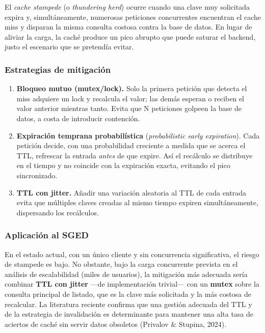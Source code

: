 \documentclass[12pt]{article}
\begin{document}
	El \textit{cache stampede} (o \textit{thundering herd}) ocurre cuando una clave muy solicitada expira y, simultáneamente, numerosas peticiones concurrentes encuentran el cache miss y disparan la misma consulta costosa contra la base de datos. En lugar de aliviar la carga, la caché produce un pico abrupto que puede saturar el backend, justo el escenario que se pretendía evitar.
	
	\subsubsection*{Estrategias de mitigación}
	
	\begin{enumerate}
		\item \textbf{Bloqueo mutuo (mutex/lock).} Solo la primera petición que detecta el miss adquiere un lock y recalcula el valor; las demás esperan o reciben el valor anterior mientras tanto. Evita que N peticiones golpeen la base de datos, a costa de introducir contención.
		\item \textbf{Expiración temprana probabilística} (\textit{probabilistic early expiration}). Cada petición decide, con una probabilidad creciente a medida que se acerca el TTL, refrescar la entrada \textit{antes} de que expire. Así el recálculo se distribuye en el tiempo y no coincide con la expiración exacta, evitando el pico sincronizado.
		\item \textbf{TTL con jitter.} Añadir una variación aleatoria al TTL de cada entrada evita que múltiples claves creadas al mismo tiempo expiren simultáneamente, dispersando los recálculos.
	\end{enumerate}
	
	\subsubsection*{Aplicación al SGED}
	
	En el estado actual, con un único cliente y sin concurrencia significativa, el riesgo de stampede es bajo. No obstante, bajo la carga concurrente prevista en el análisis de escalabilidad (miles de usuarios), la mitigación más adecuada sería combinar \textbf{TTL con jitter} —de implementación trivial— con un \textbf{mutex} sobre la consulta principal de listado, que es la clave más solicitada y la más costosa de recalcular. La literatura reciente confirma que una gestión adecuada del TTL y de la estrategia de invalidación es determinante para mantener una alta tasa de aciertos de caché sin servir datos obsoletos (Privalov \& Stupina, 2024).
	
\end{document}

